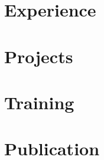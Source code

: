 \documentclass[]{article} %
\newcommand{\ExperienceList}{}
\newcommand{\ProjectList}{}
\newcommand{\TrainingList}{}
\newcommand{\PublicationList}{}
\begin{document}
\hfill
\begin{minipage}[t]{0.66\textwidth}

  \section{Experience}
  \ExperienceList

  \section{Projects}
  \ProjectList

  \section{Training}
  \TrainingList

  \section{Publication}
  \PublicationList

\end{minipage}
\end{document}
